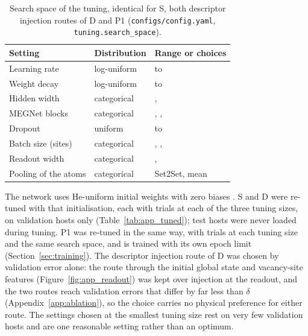 \begin{table}[H]
\caption{Search space of the tuning, identical for S, both descriptor injection routes of D and P1 (\texttt{configs/config.yaml}, \texttt{tuning.search\_space}).\label{tab:app_space}}
\centering
\small
\begin{tabular}{lll}
\toprule
Setting & Distribution & Range or choices \\
\midrule
Learning rate & log-uniform & \numCfgTuningSearchSpaceLearningRateLow{} to \numCfgTuningSearchSpaceLearningRateHigh{} \\
Weight decay & log-uniform & \numCfgTuningSearchSpaceWeightDecayLow{} to \numCfgTuningSearchSpaceWeightDecayHigh{} \\
Hidden width & categorical & \numCfgTuningSearchSpaceHiddenWidthChoicesItemOne{}, \numCfgTuningSearchSpaceHiddenWidthChoicesItemTwo{} \\
MEGNet blocks & categorical & \numCfgTuningSearchSpaceMegnetBlocksChoicesItemOne{}, \numCfgTuningSearchSpaceMegnetBlocksChoicesItemTwo{}, \numCfgTuningSearchSpaceMegnetBlocksChoicesItemThree{} \\
Dropout & uniform & \numCfgTuningSearchSpaceDropoutLow{} to \numCfgTuningSearchSpaceDropoutHigh{} \\
Batch size (sites) & categorical & \numCfgTuningSearchSpaceBatchSizeChoicesItemOne{}, \numCfgTuningSearchSpaceBatchSizeChoicesItemTwo{}, \numCfgTuningSearchSpaceBatchSizeChoicesItemThree{} \\
Readout width & categorical & \numCfgTuningSearchSpaceReadoutMlpWidthChoicesItemOne{}, \numCfgTuningSearchSpaceReadoutMlpWidthChoicesItemTwo{} \\
Pooling of the atoms & categorical & Set2Set, mean \\
\bottomrule
\end{tabular}
\end{table}

The network uses He-uniform initial weights with zero biases \citep{He2015delving}. S and D were re-tuned with that initialisation, each with \numCfgTuningOptunaTrialsPerModelPerAnchor{} trials at each of the three tuning sizes, on validation hosts only (Table~\ref{tab:app_tuned}); test hosts were never loaded during tuning. P1 was re-tuned in the same way, with \numNetStgPOneTunedSixHundredFiftyFourTrials{} trials at each tuning size and the same search space, and is trained with its own epoch limit (Section~\ref{sec:training}). The descriptor injection route of D was chosen by validation error alone: the route through the initial global state and vacancy-site features (Figure~\ref{fig:app_readout}) was kept over injection at the readout, and the two routes reach validation errors that differ by far less than $\delta$ (Appendix~\ref{app:ablation}), so the choice carries no physical preference for either route. The settings chosen at the smallest tuning size rest on very few validation hosts and are one reasonable setting rather than an optimum.


